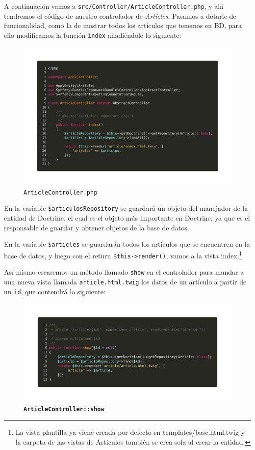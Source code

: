 A continuación vamos a \texttt{src/Controller/ArticleController.php}, y ahí tendremos el código de nuestro controlador de \textit{Articles}. Pasamos a dotarle de funcionalidad, como la de mostrar todos los artículos que tenemos en BD, para ello modificamos la función \texttt{index} añadiéndole lo siguiente:

\begin{figure}[ht]
  \centering
  \includegraphics[width=\textwidth]{../assets/article_index.png}
  \caption{\texttt{ArticleController.php}}
  \label{fig:article_index}
\end{figure}

En la variable \texttt{\$articulosRepository} se guardará un objeto del manejador de la entidad de Doctrine, el cual es el objeto más importante en Doctrine, ya que es el responsable de guardar y obtener objetos de la base de datos.

En la variable \texttt{\$articles} se guardarán todos los artículos que se encuentren en la base de datos, y luego con el return \texttt{\$this->render()}, vamos a la vista index.\footnote{La vista plantilla ya viene creada por defecto en templates/base.html.twig y la carpeta de las vistas de Articulos también se crea sola al crear la entidad.}.

Así mismo crearemos un método llamado \texttt{show} en el controlador para mandar a una nueva vista llamada \texttt{article.html.twig} los datos de un artículo a partir de un \texttt{id}, que contendrá lo siguiente:

\begin{figure}[ht]
  \centering
  \includegraphics[width=\textwidth]{../assets/article_show.png}
  \caption{\texttt{\textbf{ArticleController::show}}}
  \label{fig:article_show}
\end{figure}


